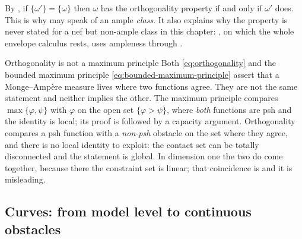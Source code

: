 \begin{remark}
\label{rem:ch27-orthogonality-class}
By , if
\(\{\omega'\}=\{\omega\}\) then \(\omega\) has the orthogonality property if
and only if \(\omega'\) does.  This is why
 may speak of an ample \emph{class}.  It
also explains why the property is never stated for a nef but non-ample
class in this chapter: , on which the
whole envelope calculus rests, uses ampleness through
.
\end{remark}

\begin{center}
\end{center}

\begin{warning}{Orthogonality is not a maximum principle}
Both \eqref{eq:orthogonality} and the bounded maximum principle
\eqref{eq:bounded-maximum-principle} assert that a Monge--Amp\`ere measure
lives where two functions agree.  They are not the same statement and
neither implies the other.  The maximum principle compares
\(\max\{\varphi,\psi\}\) with \(\varphi\) on the open set
\(\{\varphi>\psi\}\), where \emph{both} functions are psh and the identity
is local; its proof is  followed by a
capacity argument.  Orthogonality compares a psh function with a
\emph{non-psh} obstacle on the set where they agree, and there is no local
identity to exploit: the contact set can be totally disconnected and the
statement is global.  In dimension one the two do come together, because
there the constraint set is linear; that coincidence is
 and it is misleading.
\end{warning}

\subsection{Curves: from model level to continuous obstacles}
\label{sec:ch27-curve-orthogonality}

